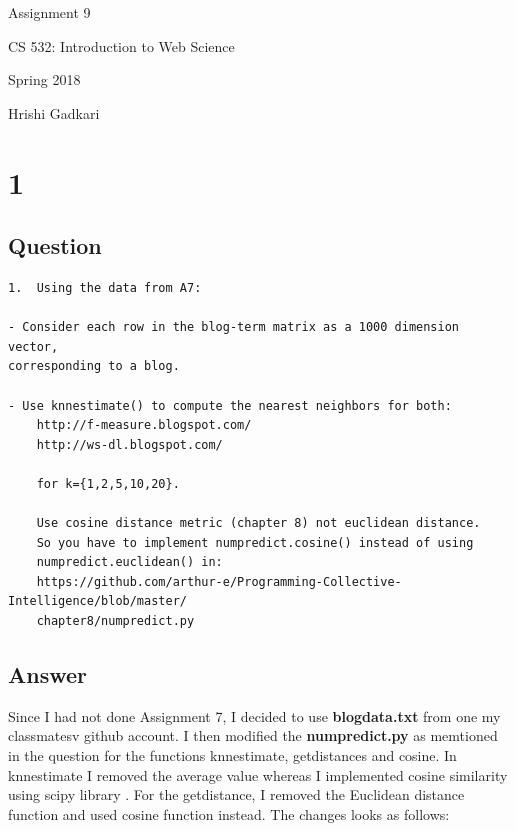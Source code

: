 \documentclass[letterpaper,11pt]{article}
\begin{document}
\begin{titlepage}

\begin{center}

\Huge{Assignment 9}

\Large{CS 532:  Introduction to Web Science}

\Large{Spring 2018}

\Large{Hrishi Gadkari}


\end{center}

\end{titlepage}

\newpage


\section*{1}

\subsection*{Question}

\begin{verbatim}
1.  Using the data from A7:

- Consider each row in the blog-term matrix as a 1000 dimension vector, 
corresponding to a blog.  

- Use knnestimate() to compute the nearest neighbors for both:
	http://f-measure.blogspot.com/
	http://ws-dl.blogspot.com/

	for k={1,2,5,10,20}.

	Use cosine distance metric (chapter 8) not euclidean distance. 
	So you have to implement numpredict.cosine() instead of using 
	numpredict.euclidean() in:
	https://github.com/arthur-e/Programming-Collective-Intelligence/blob/master/
	chapter8/numpredict.py

\end{verbatim}

\clearpage
\subsection*{Answer}

Since I had not done Assignment 7, I decided to use \textbf{blogdata.txt} from one my classmatesv\cite{gitref} github account. I then modified the \textbf{numpredict.py} as memtioned in the question \cite{numref} for the functions knnestimate, getdistances and cosine. In knnestimate I removed the average value whereas I implemented cosine similarity using scipy library \cite{libref}. For the getdistance, I removed the Euclidean distance function and used cosine function instead. The changes looks as follows:
\end{document}
